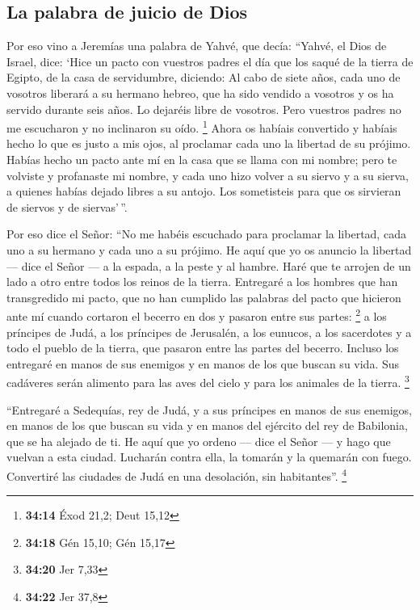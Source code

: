\begin{paracol}{2}
\hypertarget{la-palabra-de-juicio-de-dios}{%
\subsection{La palabra de juicio de
Dios}\label{la-palabra-de-juicio-de-dios}}

 Por eso vino a Jeremías una palabra de Yahvé, que decía:
 ``Yahvé, el Dios de Israel, dice: `Hice un pacto con
vuestros padres el día que los saqué de la tierra de Egipto, de la casa
de servidumbre, diciendo:  Al cabo de siete años, cada
uno de vosotros liberará a su hermano hebreo, que ha sido vendido a
vosotros y os ha servido durante seis años. Lo dejaréis libre de
vosotros. Pero vuestros padres no me escucharon y no inclinaron su oído.
\footnote{\textbf{34:14} Éxod 21,2; Deut 15,12}  Ahora os
habíais convertido y habíais hecho lo que es justo a mis ojos, al
proclamar cada uno la libertad de su prójimo. Habías hecho un pacto ante
mí en la casa que se llama con mi nombre;  pero te
volviste y profanaste mi nombre, y cada uno hizo volver a su siervo y a
su sierva, a quienes habías dejado libres a su antojo. Los sometisteis
para que os sirvieran de siervos y de siervas'\,''.

 Por eso dice el Señor: ``No me habéis escuchado para
proclamar la libertad, cada uno a su hermano y cada uno a su prójimo. He
aquí que yo os anuncio la libertad --- dice el Señor --- a la espada, a
la peste y al hambre. Haré que te arrojen de un lado a otro entre todos
los reinos de la tierra.  Entregaré a los hombres que han
transgredido mi pacto, que no han cumplido las palabras del pacto que
hicieron ante mí cuando cortaron el becerro en dos y pasaron entre sus
partes: \footnote{\textbf{34:18} Gén 15,10; Gén 15,17}  a
los príncipes de Judá, a los príncipes de Jerusalén, a los eunucos, a
los sacerdotes y a todo el pueblo de la tierra, que pasaron entre las
partes del becerro.  Incluso los entregaré en manos de
sus enemigos y en manos de los que buscan su vida. Sus cadáveres serán
alimento para las aves del cielo y para los animales de la tierra.
\footnote{\textbf{34:20} Jer 7,33}

 ``Entregaré a Sedequías, rey de Judá, y a sus príncipes
en manos de sus enemigos, en manos de los que buscan su vida y en manos
del ejército del rey de Babilonia, que se ha alejado de ti.
 He aquí que yo ordeno --- dice el Señor --- y hago que
vuelvan a esta ciudad. Lucharán contra ella, la tomarán y la quemarán
con fuego. Convertiré las ciudades de Judá en una desolación, sin
habitantes''. \footnote{\textbf{34:22} Jer 37,8}


\end{paracol}
